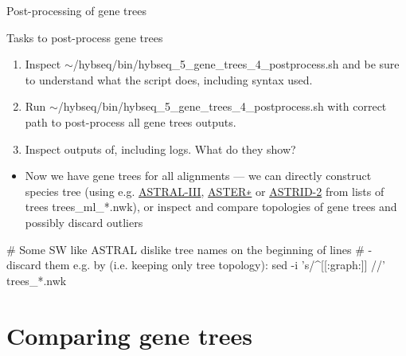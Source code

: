 \documentclass[compress,  xelatex, 11pt, xcolor=x11names, aspectratio=169,
	hyperref={
		bookmarks=true,
		unicode=true,
		colorlinks=true,
		pdftitle={HybSeq course},
		plainpages=false,
		pdfauthor={Vojtech Zeisek},
		pdfsubject={Practical processing of HybSeq target enrichment sequencing data on computing grids like MetaCentrum},
		pdfcreator={XeLaTeX},
		pdfkeywords={BASH, command line, GNU, HybSeq, Linux, MetaCentrum, sequencing shell, target enrichment},
		linkcolor=Turquoise4, %
		anchorcolor=DodgerBlue4, %
		citecolor=DodgerBlue4, %
		filecolor=DodgerBlue4, %
		menucolor=Tan4, %
		urlcolor=DarkOliveGreen4 %
		},
	url={hyphens, lowtilde} %
	]{beamer}
\renewcommand{\texttt}[1]{\colorbox{Cornsilk2}{{\ttfamily #1}}}
\begin{document}
\begin{frame}[fragile]{Post-processing of gene trees}
	\label{postgenetrees}
	\begin{exampleblock}{Tasks to post-process gene trees}
		\begin{enumerate}
			\item Inspect \texttt{$\sim$/hybseq/bin/hybseq\_5\_gene\_trees\_4\_postprocess.sh} and be sure to understand what the script does, including syntax used.
			\item Run \texttt{$\sim$/hybseq/bin/hybseq\_5\_gene\_trees\_4\_postprocess.sh} with correct path to post-process all gene trees outputs.
			\item Inspect outputs of, including logs. What do they show?
		\end{enumerate}
	\end{exampleblock}
	\begin{itemize}
		\item Now we have gene trees for all alignments --- we can directly construct species tree (using e.g. \href{https://github.com/smirarab/ASTRAL}{ASTRAL-III}, \href{https://github.com/chaoszhang/ASTER}{ASTER∗} or \href{https://github.com/pranjalv123/ASTRID}{ASTRID-2} from lists of trees \texttt{trees\_ml\_*.nwk}), or inspect and compare topologies of gene trees and possibly discard outliers
	\end{itemize}
	\begin{bashcode}
    # Some SW like ASTRAL dislike tree names on the beginning of lines
    # - discard them e.g. by (i.e. keeping only tree topology):
    sed -i 's/^[[:graph:]]\+ //' trees_*.nwk
	\end{bashcode}
\end{frame}

\section{Comparing gene trees}
\end{document}
